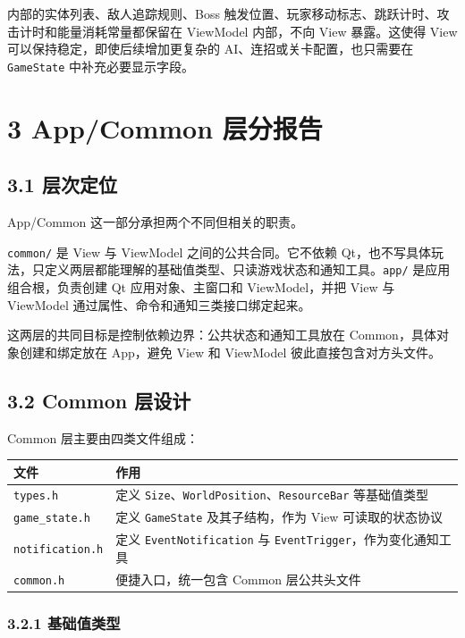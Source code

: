 \documentclass[12pt,fontset=none]{ctexart}
\begin{document}
内部的实体列表、敌人追踪规则、Boss 触发位置、玩家移动标志、跳跃计时、攻击计时和能量消耗常量都保留在 ViewModel 内部，不向 View 暴露。这使得 View 可以保持稳定，即使后续增加更复杂的 AI、连招或关卡配置，也只需要在 \texttt{GameState} 中补充必要显示字段。

\section{3 App/Common 层分报告}


\subsection{3.1 层次定位}

App/Common 这一部分承担两个不同但相关的职责。

\texttt{common/} 是 View 与 ViewModel 之间的公共合同。它不依赖 Qt，也不写具体玩法，只定义两层都能理解的基础值类型、只读游戏状态和通知工具。\texttt{app/} 是应用组合根，负责创建 Qt 应用对象、主窗口和 ViewModel，并把 View 与 ViewModel 通过属性、命令和通知三类接口绑定起来。

这两层的共同目标是控制依赖边界：公共状态和通知工具放在 Common，具体对象创建和绑定放在 App，避免 View 和 ViewModel 彼此直接包含对方头文件。

\subsection{3.2 Common 层设计}

Common 层主要由四类文件组成：

\begin{longtable}{l l}
\toprule
\textbf{文件} & \textbf{作用} \\
\midrule
\endhead
\texttt{types.h} & 定义 \texttt{Size}、\texttt{WorldPosition}、\texttt{ResourceBar} 等基础值类型 \\
\texttt{game\_state.h} & 定义 \texttt{GameState} 及其子结构，作为 View 可读取的状态协议 \\
\texttt{notification.h} & 定义 \texttt{EventNotification} 与 \texttt{EventTrigger}，作为变化通知工具 \\
\texttt{common.h} & 便捷入口，统一包含 Common 层公共头文件 \\
\bottomrule
\end{longtable}

\subsubsection{3.2.1 基础值类型}
\end{document}
